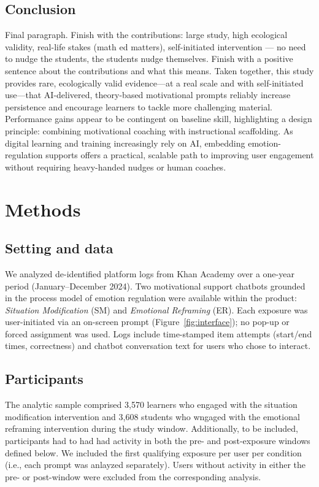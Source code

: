 \documentclass[11pt]{report}
\begin{document}
\begin{mainf}
\subsection*{Conclusion}

Final paragraph. Finish with the contributions: large study, high ecological validity, real-life stakes (math ed matters), self-initiated intervention --- no need to nudge the students, the students nudge themselves. Finish with a positive sentence about the contributions and what this means.
Taken together, this study provides rare, ecologically valid evidence—at a real scale and with self-initiated use—that AI-delivered, theory-based motivational prompts reliably increase persistence and encourage learners to tackle more challenging material.
Performance gains appear to be contingent on baseline skill, highlighting a design principle: combining motivational coaching with instructional scaffolding.
As digital learning and training increasingly rely on AI, embedding emotion-regulation supports offers a practical, scalable path to improving user engagement without requiring heavy-handed nudges or human coaches. 

  



\section*{Methods}

\subsection*{Setting and data}
We analyzed de-identified platform logs from Khan Academy over a one-year period (January–December 2024).
Two motivational support chatbots grounded in the process model of emotion regulation were available within the product: \emph{Situation Modification} (SM) and \emph{Emotional Reframing} (ER).
Each exposure was user-initiated via an on-screen prompt (Figure~\ref{fig:interface}); no pop-up or forced assignment was used.
Logs include time-stamped item attempts (start/end times, correctness) and chatbot conversation text for users who chose to interact.

\subsection*{Participants}
The analytic sample comprised 3,570 learners who engaged with the situation modification intervention and 3,608 students who wngaged with the emotional reframing intervention during the study window. Additionally, to be included, participants had to had had activity in both the pre- and post-exposure windows defined below.
We included the first qualifying exposure per user per condition (i.e., each prompt was anlayzed separately).
Users without activity in either the pre- or post-window were excluded from the corresponding analysis.


\end{mainf}
\end{document}
